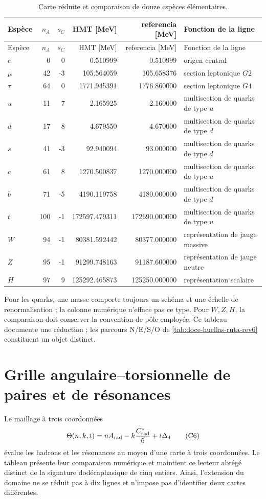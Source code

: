 \begin{longtable}{@{}lrrrrL{0.22\textwidth}@{}}
\caption{Carte réduite et comparaison de douze espèces élémentaires.}
\label{tab:doce-control-inverso-rev6}\\
\toprule
Espèce&\(n_A\)&\(s_C\)&{HMT [MeV]}&{referencia [MeV]}&Fonction de la ligne\\
\midrule
\endfirsthead
\toprule
Espèce&\(n_A\)&\(s_C\)&{HMT [MeV]}&{referencia [MeV]}&Fonction de la ligne\\
\midrule
\endhead
\(e\)&0&0&0.510999&0.510999&origen central\\
\(\mu\)&42&-3&105.564059&105.658376&section leptonique \(G2\)\\
\(\tau\)&64&0&1771.945391&1776.860000&section leptonique \(G4\)\\
\(u\)&11&7&2.165925&2.160000&multisection de quarks de type \(u\)\\
\(d\)&17&8&4.679550&4.670000&multisection de quarks de type \(d\)\\
\(s\)&41&-3&92.940094&93.000000&multisection de quarks de type \(d\)\\
\(c\)&61&8&1270.500837&1270.000000&multisection de quarks de type \(u\)\\
\(b\)&71&-5&4190.119758&4180.000000&multisection de quarks de type \(d\)\\
\(t\)&100&-1&172597.479311&172690.000000&multisection de quarks de type \(u\)\\
\(W\)&94&-1&80381.592442&80377.000000&représentation de jauge massive\\
\(Z\)&95&-1&91299.748163&91187.600000&représentation de jauge neutre\\
\(H\)&97&9&125292.465873&125250.000000&représentation scalaire\\
\bottomrule
\end{longtable}

Pour les quarks, une masse comporte toujours un schéma et une échelle de
renormalisation ; la colonne numérique n'efface pas ce type. Pour \(W,Z,H\), la
comparaison doit conserver la convention de pôle employée. Ce tableau
documente une réduction ; les parcours N/E/S/O de
\cref{tab:doce-huellas-ruta-rev6} constituent un objet distinct.

\section{Grille angulaire--torsionnelle de paires et de résonances}

Le maillage à trois coordonnées
\[
\Theta(n,k,t)
=nA_{\rm rad}-k\frac{C^*_{\rm rad}}6+t\Delta_4
\tag{C6}\label{eq:malla-extendida-resonancias-rev6}
\]
évalue les hadrons et les résonances au moyen d'une carte à trois coordonnées. Le tableau
présente leur comparaison numérique et maintient ce lecteur abrégé distinct de
la signature dodécaphasique de cinq entiers. Ainsi, l'extension du domaine ne se
réduit pas à dix lignes et n'impose pas d'identifier deux cartes différentes.

